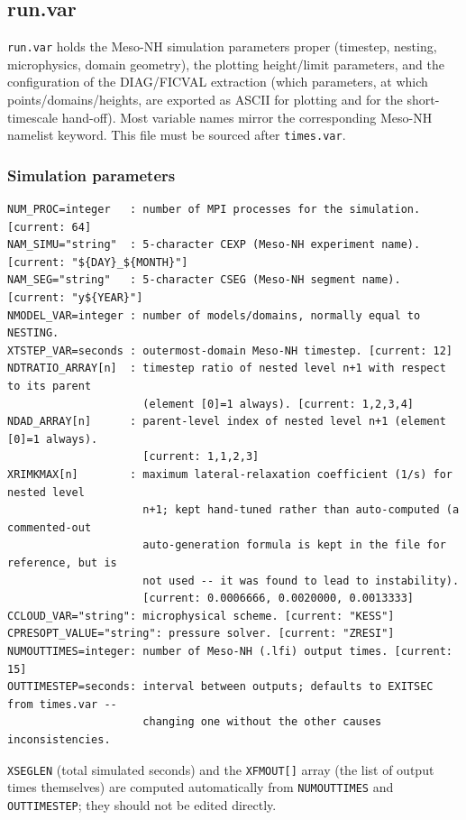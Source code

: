 \subsection{run.var}
\texttt{run.var} holds the Meso-NH simulation parameters proper (timestep, nesting, microphysics,
domain geometry), the plotting height/limit parameters, and the configuration of the DIAG/FICVAL
extraction (which parameters, at which points/domains/heights, are exported as ASCII for plotting and
for the short-timescale hand-off). Most variable names mirror the corresponding Meso-NH namelist
keyword. This file must be sourced after \texttt{times.var}.

\subsubsection{Simulation parameters}
\begin{lstlisting}
NUM_PROC=integer   : number of MPI processes for the simulation. [current: 64]
NAM_SIMU="string"  : 5-character CEXP (Meso-NH experiment name). [current: "${DAY}_${MONTH}"]
NAM_SEG="string"   : 5-character CSEG (Meso-NH segment name). [current: "y${YEAR}"]
NMODEL_VAR=integer : number of models/domains, normally equal to NESTING.
XTSTEP_VAR=seconds : outermost-domain Meso-NH timestep. [current: 12]
NDTRATIO_ARRAY[n]  : timestep ratio of nested level n+1 with respect to its parent
                     (element [0]=1 always). [current: 1,2,3,4]
NDAD_ARRAY[n]      : parent-level index of nested level n+1 (element [0]=1 always).
                     [current: 1,1,2,3]
XRIMKMAX[n]        : maximum lateral-relaxation coefficient (1/s) for nested level
                     n+1; kept hand-tuned rather than auto-computed (a commented-out
                     auto-generation formula is kept in the file for reference, but is
                     not used -- it was found to lead to instability).
                     [current: 0.0006666, 0.0020000, 0.0013333]
CCLOUD_VAR="string": microphysical scheme. [current: "KESS"]
CPRESOPT_VALUE="string": pressure solver. [current: "ZRESI"]
NUMOUTTIMES=integer: number of Meso-NH (.lfi) output times. [current: 15]
OUTTIMESTEP=seconds: interval between outputs; defaults to EXITSEC from times.var --
                     changing one without the other causes inconsistencies.
\end{lstlisting}
\texttt{XSEGLEN} (total simulated seconds) and the \texttt{XFMOUT[]} array (the list of output times
themselves) are computed automatically from \texttt{NUMOUTTIMES} and \texttt{OUTTIMESTEP}; they should
not be edited directly.

